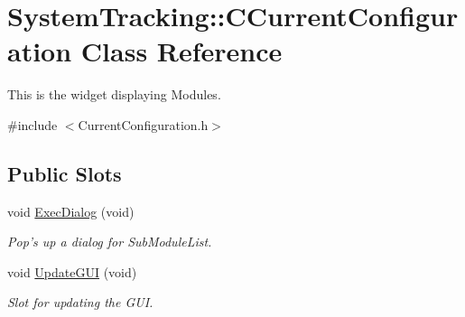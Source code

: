 \hypertarget{classSystemTracking_1_1CCurrentConfiguration}{\section{\-System\-Tracking\-:\-:\-C\-Current\-Configuration \-Class \-Reference}
\label{classSystemTracking_1_1CCurrentConfiguration}
}


\-This is the widget displaying \-Modules.  




{\ttfamily \#include $<$\-Current\-Configuration.\-h$>$}

\subsection*{\-Public \-Slots}
\begin{DoxyCompactItemize}
\item 
void \hyperlink{classSystemTracking_1_1CCurrentConfiguration_ab868356f05df7d042355edf54788b96d}{\-Exec\-Dialog} (void)
\begin{DoxyCompactList}\small\item\em \-Pop's up a dialog for \-Sub\-Module\-List. \end{DoxyCompactList}\item 
void \hyperlink{classSystemTracking_1_1CCurrentConfiguration_ae8faa1b7f36c6c40b401c6abce264d99}{\-Update\-G\-U\-I} (void)
\begin{DoxyCompactList}\small\item\em \-Slot for updating the \-G\-U\-I. \end{DoxyCompactList}\end{DoxyCompactItemize}
